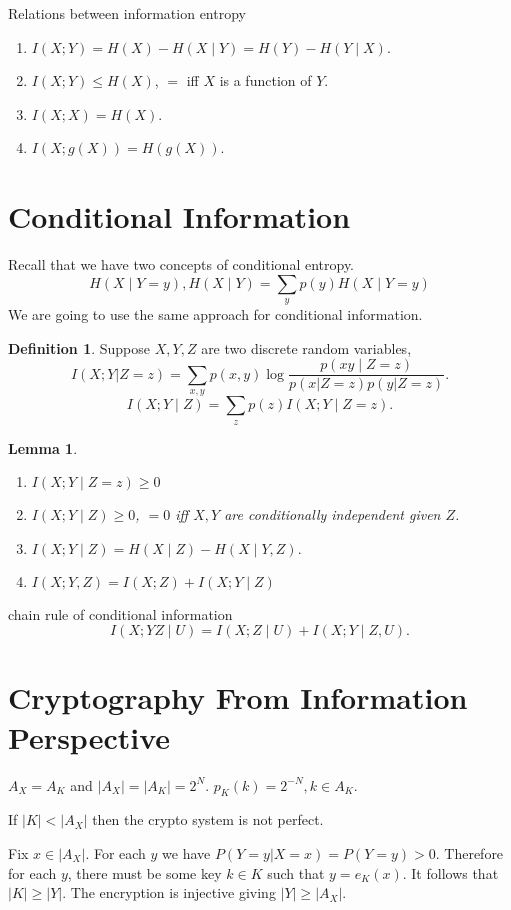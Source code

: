 \documentclass{report}
\newtheorem{lemma}{Lemma}[section]
\theoremstyle{definition}
\newtheorem{definition}{Definition}[section]
\theoremstyle{remark}
\numberwithin{equation}{section}
\begin{document}
Relations between information entropy
\begin{enumerate}
  \item $I(X; Y) = H(X) - H(X \mid Y) = H(Y) - H(Y \mid X)$.
  \item $I(X; Y) \leq H(X)$, $=$ iff $X$ is a function of $Y$.
  \item $I(X; X) = H(X)$.
  \item $I(X; g(X)) = H(g(X))$.
\end{enumerate}

\section{Conditional Information}
Recall that we have two concepts of conditional entropy.
\[
  H(X \mid Y = y) , H(X \mid Y) = \sum_y p(y) H(X \mid Y = y) 
\]
We are going to use the same approach for conditional information.
\begin{definition}
  Suppose $X, Y, Z$ are two discrete random variables, \[
    I(X; Y | Z = z) = \sum_{x, y} p(x, y) \log \frac{p(xy \mid Z = z)}{p(x| Z = z)p(y| Z = z)}.
  \] \[I(X; Y \mid Z) = \sum_z p(z) I(X; Y \mid Z = z).\]
\end{definition}

\begin{lemma}
  \begin{enumerate}
    \item \(I(X ; Y \mid Z = z) \geq 0\)
    \item \(I(X; Y \mid Z) \geq 0\), \(= 0\) iff $X, Y$ are conditionally independent given $Z$.
    \item \(I(X; Y \mid Z) = H(X \mid Z) - H(X \mid Y,Z).\)
    \item \(I(X; Y, Z) = I(X; Z) + I(X; Y \mid Z)\)
  \end{enumerate}
\end{lemma}

chain rule of conditional information
\[I(X; YZ \mid U) = I(X; Z \mid U) + I(X; Y \mid Z, U).\]

\section{Cryptography From Information Perspective}

$A_X = A_K$ and $|A_X| = |A_K| = 2^N$. $p_K(k) = 2^{-N}, k \in A_K$.

If $|K| < |A_X|$ then the crypto system is not perfect.

Fix $x \in |A_X|$. For each $y$ we have
$P(Y = y|X = x) = P(Y = y) > 0$. Therefore for each $y$, there
must be some key $k \in K$ such that $y = e_K(x)$. It follows that
$|K| \geq |Y|$. The encryption is injective giving $|Y| \geq |A_X|$.
\end{document}
